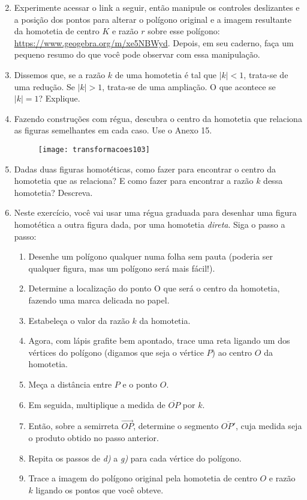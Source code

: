 \begin{enumerate}
\setcounter{enumi}{1}
\item Experimente acessar o link a seguir, então manipule os controles deslizantes e a posição dos pontos para alterar o polígono original e a imagem resultante da homotetia de centro $K$ e razão $r$ sobre esse polígono: \url{https://www.geogebra.org/m/xe5NBWyd}. Depois, em seu caderno, faça um pequeno resumo do que você pode observar com essa manipulação. 

\item Dissemos que, se a razão $k$ de uma homotetia é tal que $|k|<1$, trata-se de uma redução. Se $|k|>1$, trata-se de uma ampliação. O que acontece se $|k|=1$? Explique.

\item Fazendo construções com régua, descubra o centro da homotetia que relaciona as figuras semelhantes em cada caso.  Use o Anexo 15.

\begin{figure}[H]
\centering

\texttt{[image: transformacoes103]}
\end{figure}

\item Dadas duas figuras homotéticas, como fazer para encontrar o centro da homotetia que as relaciona? E como fazer para encontrar a razão $k$ dessa homotetia? Descreva. 

\item   Neste exercício, você vai usar uma régua graduada para desenhar uma figura homotética a outra figura dada, por uma homotetia \textit{direta}. Siga o passo a passo: 
\begin{enumerate}
\item Desenhe um polígono qualquer numa folha sem pauta (poderia ser qualquer figura, mas um polígono será mais fácil!).
\item Determine a localização do ponto O que será o centro da homotetia, fazendo uma marca delicada no papel. 
\item Estabeleça o valor da razão $k$ da homotetia. 
\item Agora, com lápis grafite bem apontado, trace uma reta ligando um dos vértices do polígono (digamos que seja o vértice $P$) ao centro $O$ da homotetia. 
\item Meça a distância entre $P$ e o ponto $O$. 
\item Em seguida, multiplique a medida de $\overline{OP}$ por $k$. 
\item Então, sobre a semirreta $\overrightarrow{OP}$, determine o segmento $\overline{OP'}$, cuja medida seja o produto obtido no passo anterior.
\item Repita os passos de \textit{d)} a \textit{g)} para cada vértice do polígono. 
\item Trace a imagem do polígono original pela homotetia de centro $O$ e razão $k$ ligando os pontos que você obteve.
\end{enumerate}


\end{enumerate}
